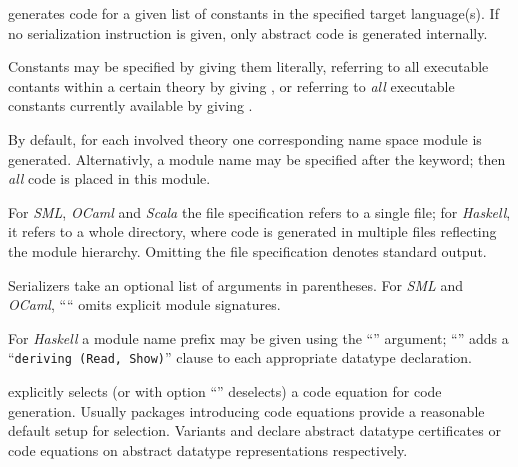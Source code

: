 \begin{isabellebody}
\begin{isamarkuptext}
  \begin{description}

  \item \hyperlink{command.HOL.export-code}{\mbox{}} generates code for a given list
  of constants in the specified target language(s).  If no
  serialization instruction is given, only abstract code is generated
  internally.

  Constants may be specified by giving them literally, referring to
  all executable contants within a certain theory by giving , or referring to \emph{all} executable constants currently
  available by giving .

  By default, for each involved theory one corresponding name space
  module is generated.  Alternativly, a module name may be specified
  after the \hyperlink{keyword.module-name}{\mbox{}} keyword; then \emph{all} code is
  placed in this module.

  For \emph{SML}, \emph{OCaml} and \emph{Scala} the file specification
  refers to a single file; for \emph{Haskell}, it refers to a whole
  directory, where code is generated in multiple files reflecting the
  module hierarchy.  Omitting the file specification denotes standard
  output.

  Serializers take an optional list of arguments in parentheses.  For
  \emph{SML} and \emph{OCaml}, ```` omits
  explicit module signatures.

  For \emph{Haskell} a module name prefix may be given using the
  ``'' argument; ``'' adds a
  ``\verb|deriving (Read, Show)|'' clause to each appropriate
  datatype declaration.

  \item \hyperlink{attribute.HOL.code}{\mbox{}} explicitly selects (or with option
  ``'' deselects) a code equation for code generation.
  Usually packages introducing code equations provide a reasonable
  default setup for selection.  Variants  and
   declare abstract datatype certificates or
  code equations on abstract datatype representations respectively.


\end{description}
\end{isamarkuptext}
\end{isabellebody}
